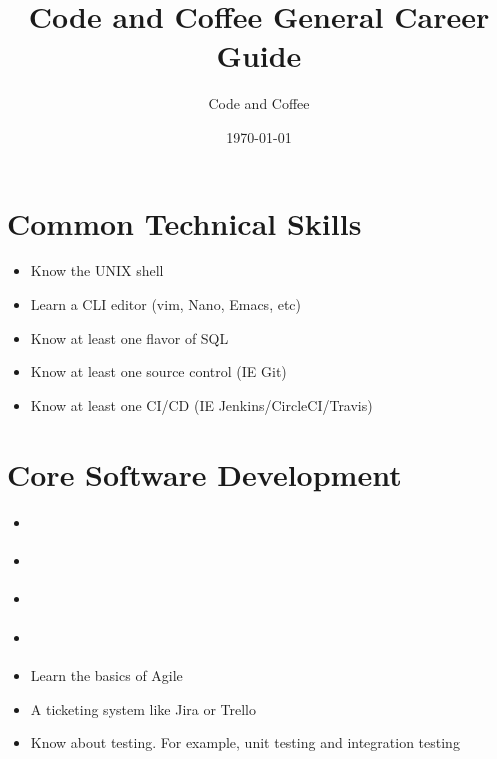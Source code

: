 \documentclass[12pt]{article}
\title{Code and Coffee General Career Guide}
\author{Code and Coffee}
\date{\today}
\begin{document}
\maketitle

\section{Common Technical Skills}
\begin{itemize}
\item Know the UNIX shell
\item Learn a CLI editor (vim, Nano, Emacs, etc)
\item Know at least one flavor of SQL
\item Know at least one source control (IE Git)
\item Know at least one CI/CD (IE Jenkins/CircleCI/Travis)
\end{itemize}

\section{Core Software Development}
\begin{itemize}
\item \autocite{mcdowell2015interview}
\item \autocite{skiena2008algorithm}
\item \autocite{gamma1994patterns}
\item \autocite{martin2010clean}
\item Learn the basics of Agile
\item A ticketing system like Jira or Trello
\item Know about testing.  For example, unit testing and integration testing
\end{itemize}
\end{document}
